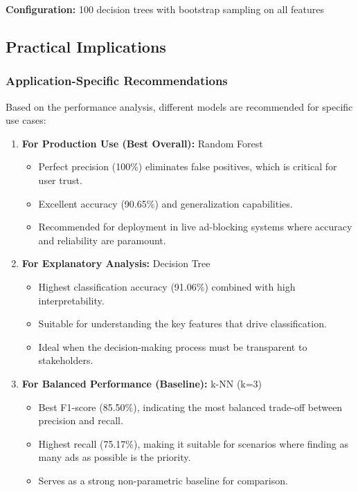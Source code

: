 \textbf{Configuration:} 100 decision trees with bootstrap sampling on all features

\subsection{Practical Implications}

\subsubsection{Application-Specific Recommendations}

Based on the performance analysis, different models are recommended for specific use cases:

\begin{enumerate}
    \item \textbf{For Production Use (Best Overall):} Random Forest
    \begin{itemize}
        \item Perfect precision (100\%) eliminates false positives, which is critical for user trust.
        \item Excellent accuracy (90.65\%) and generalization capabilities.
        \item Recommended for deployment in live ad-blocking systems where accuracy and reliability are paramount.
    \end{itemize}
    
    \item \textbf{For Explanatory Analysis:} Decision Tree
    \begin{itemize}
        \item Highest classification accuracy (91.06\%) combined with high interpretability.
        \item Suitable for understanding the key features that drive classification.
        \item Ideal when the decision-making process must be transparent to stakeholders.
    \end{itemize}
    
    \item \textbf{For Balanced Performance (Baseline):} k-NN (k=3)
    \begin{itemize}
        \item Best F1-score (85.50\%), indicating the most balanced trade-off between precision and recall.
        \item Highest recall (75.17\%), making it suitable for scenarios where finding as many ads as possible is the priority.
        \item Serves as a strong non-parametric baseline for comparison.
    \end{itemize}
\end{enumerate}

